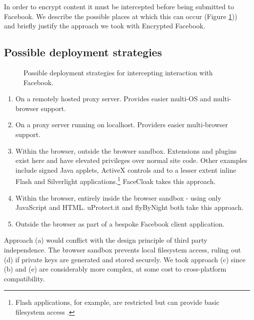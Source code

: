 In order to encrypt content it must be intercepted before being submitted to Facebook. We describe the possible places at which this can occur (Figure \ref{fig:approaches})) and briefly justify the approach we took with Encrypted Facebook.

\subsection{Possible deployment strategies}

\begin{figure}[tb]
\begin{center}
    
\caption{Possible deployment strategies for intercepting interaction with Facebook.}
\label{fig:approaches}
\end{center}
\end{figure}


\begin{enumerate}
\renewcommand{\labelenumi}{\alph{enumi})}
    
    \item On a remotely hosted proxy server. Provides easier multi-OS and multi-browser support.
    
    \item On a proxy server running on localhost. Providers easier multi-browser support.
    
    \item Within the browser, outside the browser sandbox. Extensions and plugins exist here and have elevated privileges over normal site code. Other examples include signed Java applets, ActiveX controls and to a lesser extent inline Flash and Silverlight applications.\footnote{Flash applications, for example, are restricted but can provide basic filesystem access \cite{flash-sbox}.} FaceCloak takes this approach.
    
    \item Within the browser, entirely inside the browser sandbox - using only JavaScript and HTML. uProtect.it and flyByNight both take this approach.
    
    \item Outside the browser as part of a bespoke Facebook client application.
    
\end{enumerate}
   
Approach (a) would conflict with the design principle of third party independence. The browser sandbox prevents local filesystem access, ruling out (d) if private keys are generated and stored securely. We took approach (c) since (b) and (e) are considerably more complex, at some cost to cross-platform compatibility.



